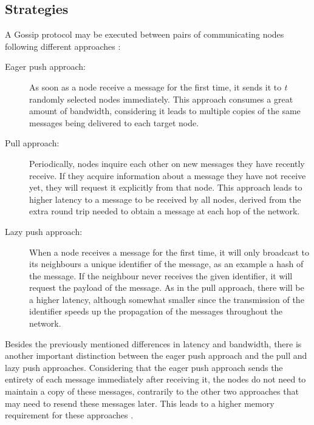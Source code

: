 \subsection{Strategies}
\label{subsec:gossip_strategies}
A Gossip protocol may be executed between pairs of communicating nodes following different
approaches \cite{Karp2000}:
\begin{description}
      \item[Eager push approach:] As soon as a node receive a message for the first time, it
            sends it to \textit{t} randomly selected nodes immediately. This approach consumes
            a great amount of bandwidth, considering it leads to multiple copies of the same
            messages being delivered to each target node.
      \item[Pull approach:] Periodically, nodes inquire each other on new messages they have
            recently receive. If they acquire information about a message they have not
            receive yet, they will request it explicitly from that node. This approach
            leads to higher latency to a message to be received by all nodes, derived from the
            extra round trip needed to obtain a message at each hop of the network.
      \item[Lazy push approach:] When a node receives a message for the first time, it will
            only broadcast to its neighbours a unique identifier of the message, as an example
            a hash of the message. If the neighbour never receives the given identifier, it will
            request the payload of the message. As in the pull approach, there will be a higher
            latency, although somewhat smaller since the transmission of the identifier speeds
            up the propagation of the messages throughout the network.
\end{description}

Besides the previously mentioned differences in latency and bandwidth, there is another
important distinction between the eager push approach and the pull and lazy push approaches.
Considering that the eager push approach sends the entirety of each message immediately after
receiving it, the nodes do not need to maintain a copy of these messages, contrarily to the
other two approaches that may need to resend these messages later. This leads to a higher
memory requirement for these approaches \cite{Leitao2012}.


